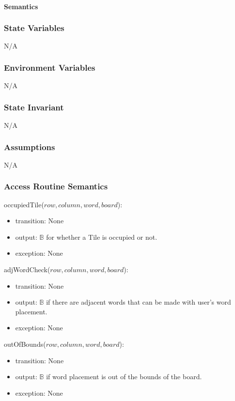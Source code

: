 \documentclass[12pt]{article}
\begin{document}
\paragraph* {Semantics}

\subsubsection*{State Variables}

N/A

\subsubsection*{Environment Variables}

N/A

\subsubsection*{State Invariant}

N/A

\subsubsection*{Assumptions}

N/A

\subsubsection* {Access Routine Semantics}

\noindent occupiedTile($row, column, word, board$):
\begin{itemize}
\item transition: None
\item output: $\mathbb{B}$ for whether a Tile is occupied or not.
\item exception: None
\end{itemize}

\noindent adjWordCheck($row, column, word, board$):
\begin{itemize}
\item transition: None
\item output: $\mathbb{B}$ if there are adjacent words that can be made with user's word placement.
\item exception: None
\end{itemize}

\noindent outOfBounds($row, column, word, board$):
\begin{itemize}
\item transition: None
\item output: $\mathbb{B}$ if word placement is out of the bounds of the board.
\item exception: None
\end{itemize}
\end{document}
